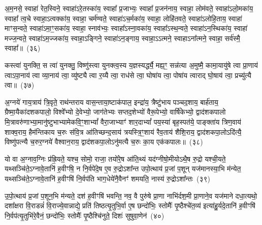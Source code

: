 अ॒म॒नसे॒ स्वाहा॑ रेत॒स्विने॒ स्वाहा॑\-ऽरे॒तस्का॑य॒ स्वाहा᳚ प्र॒जाभ्यः॒ स्वाहा᳚ प्र॒जन॑नाय॒ स्वाहा॒ लोम॑वते॒ स्वाहा॑\-ऽलो॒मका॑य॒ स्वाहा᳚ त्व॒चे स्वाहा॒\-ऽत्वक्का॑य॒ स्वाहा॒ चर्म॑ण्वते॒ स्वाहा॑\-ऽच॒र्मका॑य॒ स्वाहा॒ लोहि॑तवते॒ स्वाहा॑\-ऽलोहि॒ताय॒ स्वाहा॑ माꣳस॒न्वते॒ स्वाहा॑\-ऽमा॒ꣳ॒सका॑य॒ स्वाहा॒ स्नाव॑भ्यः॒ स्वाहा᳚\-ऽस्ना॒वका॑य॒ स्वाहा᳚\-ऽस्थ॒न्वते॒ स्वाहा॑\-ऽन॒स्थिका॑य॒ स्वाहा॑ मज्ज॒न्वते॒ स्वाहा॑\-ऽम॒ज्जका॑य॒ स्वाहा॒\-ऽङ्गिने॒ स्वाहा॑\-ऽन॒ङ्गाय॒ स्वाहा॒\-ऽऽ\-त्मने॒ स्वाहा\-ऽना᳚त्मने॒ स्वाहा॒ सर्व॑स्मै॒ स्वाहा᳚॥~(३६)

{\anuvakamend[{म॒न॒स्विने॒ स्वाहा\-ऽना᳚त्मने॒ स्वाहा॒ द्वे च॑}]}%

कस्त्वा॑ युनक्ति॒ स त्वा॑ युनक्तु॒ विष्णु॑स्त्वा युनक्त्व॒स्य य॒ज्ञस्यर्द्ध्यै॒ मह्य॒ꣳ॒ सन्न॑त्या अ॒मुष्मै॒ कामा॒यायु॑षे त्वा प्रा॒णाय॑ त्वा\-ऽपा॒नाय॑ त्वा व्या॒नाय॑ त्वा॒ व्यु॑ष्ट्यै त्वा र॒य्यै त्वा॒ राध॑से त्वा॒ घोषा॑य त्वा॒ पोषा॑य त्वाराद् घो॒षाय॑ त्वा॒ प्रच्यु॑त्यै त्वा॥~(३७)

{\anuvakamend[{कस्त्वा॒\-ऽष्टात्रिꣳ॑शत्}]}%

अ॒ग्नये॑ गाय॒त्राय॑ त्रि॒वृते॒ राथ॑न्तराय वास॒न्ताया॒ष्टाक॑पाल॒ इन्द्रा॑य॒ त्रैष्टु॑भाय पञ्चद॒शाय॒ बार्\mbox{}ह॑ताय॒ ग्रैष्मा॒यैका॑\-दश\-कपालो॒ विश्वे᳚भ्यो दे॒वेभ्यो॒ जाग॑तेभ्यः सप्तद॒शेभ्यो॑ वैरू॒पेभ्यो॒ वार्\mbox{}षि॑केभ्यो॒ द्वाद॑श\-कपालो मि॒त्रावरु॑णाभ्या॒मानु॑ष्टुभाभ्यामेक\-वि॒ꣳ॒शा\-भ्यां᳚ वैरा॒जाभ्याꣳ॑ शार॒दा\-भ्यां᳚ पय॒स्या॑ बृह॒स्पत॑ये॒ पाङ्क्ता॑य त्रिण॒वाय॑ शाक्व॒राय॒ हैम॑न्तिकाय च॒रुः स॑वि॒त्र आ॑तिच्छन्द॒साय॑ त्रयस्त्रि॒ꣳ॒शाय॑ रैव॒ताय॑ शैशि॒राय॒ द्वाद॑श\-कपा॒लो\-ऽदि॑त्यै॒ विष्णु॑पत्न्यै च॒रुर॒ग्नये॑ वैश्वान॒राय॒ द्वाद॑श\-कपा॒लो\-ऽनु॑मत्यै च॒रुः का॒य एक॑कपालः॥~(३८)

{\anuvakamend[{अ॒ग्नये\-ऽदि॑त्या॒ अनु॑मत्यै स॒प्तच॑त्वारिꣳशत्}]}%

यो वा अ॒ग्नाव॒ग्निः प्र॑ह्रि॒यते॒ यश्च॒ सोमो॒ राजा॒ तयो॑रे॒ष आ॑ति॒थ्यं यद॑ग्नीषो॒मीयो\-ऽथै॒ष रु॒द्रो यश्ची॒यते॒ यथ्सञ्चि॑ते॒\-ऽग्नावे॒तानि॑ ह॒वीꣳषि॒ न नि॒र्वपे॑दे॒ष ए॒व रु॒द्रो\-ऽशा᳚न्त उपो॒त्थाय॑ प्र॒जां प॒शून् यज॑मानस्या॒भि म॑न्येत॒ यथ्सञ्चि॑ते॒\-ऽग्नावे॒तानि॑ ह॒वीꣳषि॑ नि॒र्वप॑ति भाग॒धेये॑नै॒वैनꣳ॑ शमयति॒ नास्य॑ रु॒द्रो\-ऽशा᳚न्तः~(३९)

उ॒पो॒त्थाय॑ प्र॒जां प॒शून॒भि म॑न्यते॒ दश॑ ह॒वीꣳषि॑ भवन्ति॒ नव॒ वै पुरु॑षे प्रा॒णा नाभि॑र्दश॒मी प्रा॒णाने॒व यज॑माने दधा॒त्यथो॒ दशा᳚क्षरा वि॒राडन्नं॑ वि॒राज्ये॒वान्नाद्ये॒ प्रति॑ तिष्ठत्यृ॒तुभि॒र्वा ए॒ष छन्दो॑भिः॒ स्तोमैः᳚ पृ॒ष्ठैश्चे॑त॒व्य॑ इत्या॑हु॒र्यदे॒तानि॑ ह॒वीꣳषि॑ नि॒र्वप॑त्यृ॒तुभि॑रे॒वैनं॒ छन्दो॑भिः॒ स्तोमैः᳚ पृ॒ष्ठैश्चि॑नुते॒ दिशः॑ सुषुवा॒णेन॑~(४०)

